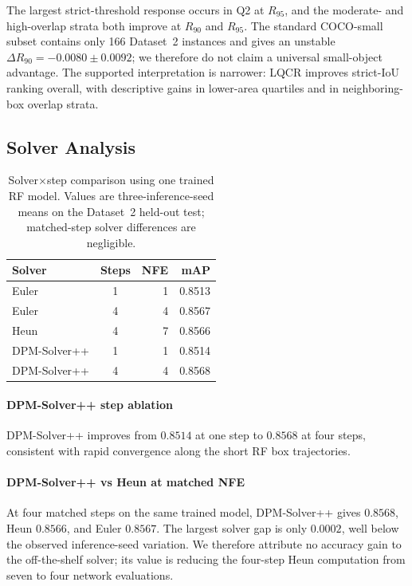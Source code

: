 \documentclass[journal,10pt]{IEEEtran}
\theoremstyle{definition}
\begin{document}
The largest strict-threshold response occurs in Q2 at $R_{95}$, and the
moderate- and high-overlap strata both improve at $R_{90}$ and $R_{95}$.
The standard COCO-small subset contains only 166 Dataset~2 instances and gives
an unstable $\Delta R_{90}=-0.0080\pm0.0092$; we therefore do not claim a
universal small-object advantage. The supported interpretation is narrower:
LQCR improves strict-IoU ranking overall, with descriptive gains in lower-area
quartiles and in neighboring-box overlap strata.


\subsection{Solver Analysis}\label{sec:exp-solver}

\begin{table}[t]
  \centering
  \small
  \caption{Solver$\times$step comparison using one trained RF model.
  Values are three-inference-seed means on the Dataset~2 held-out test;
  matched-step solver differences are negligible.}
  \label{tab:solver-ablation}
  \begin{tabular}{lcrr}
    \toprule
    Solver & Steps & NFE & mAP \\
    \midrule
    Euler              & 1 & 1 & 0.8513 \\
    Euler              & 4 & 4 & 0.8567 \\
    Heun               & 4 & 7 & 0.8566 \\
    DPM-Solver++       & 1 & 1 & 0.8514 \\
    DPM-Solver++       & 4 & 4 & 0.8568 \\
    \bottomrule
  \end{tabular}
\end{table}

\paragraph{DPM-Solver++ step ablation}
DPM-Solver++ improves from $0.8514$ at one step to $0.8568$ at four steps,
consistent with rapid convergence along the short RF box trajectories.

\paragraph{DPM-Solver++ vs Heun at matched NFE}
At four matched steps on the same trained model, DPM-Solver++ gives $0.8568$,
Heun $0.8566$, and Euler $0.8567$. The largest solver gap is only $0.0002$,
well below the observed inference-seed variation. We therefore attribute no
accuracy gain to the off-the-shelf solver; its value is reducing the
four-step Heun computation from seven to four network evaluations.
\end{document}
